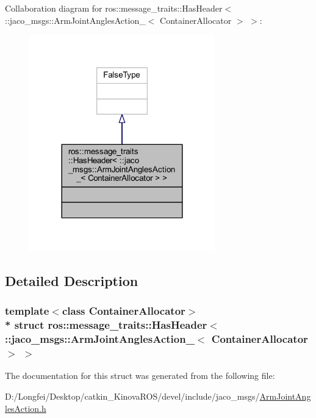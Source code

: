 Collaboration diagram for ros\+:\+:message\+\_\+traits\+:\+:Has\+Header$<$ \+:\+:jaco\+\_\+msgs\+:\+:Arm\+Joint\+Angles\+Action\+\_\+$<$ Container\+Allocator $>$ $>$\+:
\nopagebreak
\begin{figure}[H]
\begin{center}
\leavevmode
\includegraphics[width=228pt]{d5/d04/structros_1_1message__traits_1_1HasHeader_3_01_1_1jaco__msgs_1_1ArmJointAnglesAction___3_01Conta2b428f22bec83c7de5b41ed18aa17d45}
\end{center}
\end{figure}


\subsection{Detailed Description}
\subsubsection*{template$<$class Container\+Allocator$>$\\*
struct ros\+::message\+\_\+traits\+::\+Has\+Header$<$ \+::jaco\+\_\+msgs\+::\+Arm\+Joint\+Angles\+Action\+\_\+$<$ Container\+Allocator $>$ $>$}



The documentation for this struct was generated from the following file\+:\begin{DoxyCompactItemize}
\item 
D\+:/\+Longfei/\+Desktop/catkin\+\_\+\+Kinova\+R\+O\+S/devel/include/jaco\+\_\+msgs/\hyperlink{ArmJointAnglesAction_8h}{Arm\+Joint\+Angles\+Action.\+h}\end{DoxyCompactItemize}
